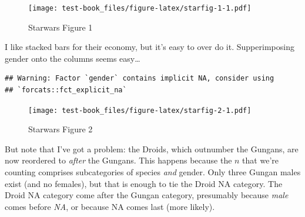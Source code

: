 \documentclass[]{book}
\newenvironment{Shaded}{\begin{snugshade}}{\end{snugshade}}
\newcommand{\DataTypeTok}[1]{\textcolor[rgb]{0.13,0.29,0.53}{#1}}
\newcommand{\DecValTok}[1]{\textcolor[rgb]{0.00,0.00,0.81}{#1}}
\newcommand{\KeywordTok}[1]{\textcolor[rgb]{0.13,0.29,0.53}{\textbf{#1}}}
\newcommand{\NormalTok}[1]{#1}
\newcommand{\OperatorTok}[1]{\textcolor[rgb]{0.81,0.36,0.00}{\textbf{#1}}}
\newcommand{\OtherTok}[1]{\textcolor[rgb]{0.56,0.35,0.01}{#1}}
\newcommand{\StringTok}[1]{\textcolor[rgb]{0.31,0.60,0.02}{#1}}
\begin{document}
\begin{figure}
\centering
\texttt{[image: test-book\_files/figure-latex/starfig-1-1.pdf]}
\caption{\label{fig:starfig-1}Starwars Figure 1}
\end{figure}

I like stacked bars for their economy, but it's easy to over do it. Supperimposing gender onto the columns seems easy\ldots{}

\begin{Shaded}
\end{Shaded}

\begin{verbatim}
## Warning: Factor `gender` contains implicit NA, consider using
## `forcats::fct_explicit_na`
\end{verbatim}

\begin{figure}
\centering
\texttt{[image: test-book\_files/figure-latex/starfig-2-1.pdf]}
\caption{\label{fig:starfig-2}Starwars Figure 2}
\end{figure}

But note that I've got a problem: the Droids, which outnumber the Gungans, are now reordered to \emph{after} the Gungans. This happens because the \(n\) that we're counting comprises subcategories of species \emph{and} gender. Only three Gungan males exist (and no females), but that is enough to tie the Droid NA category. The Droid NA category come after the Gungan category, presumably because \emph{male} comes before \emph{NA}, or because NA comes last (more likely).
\end{document}
